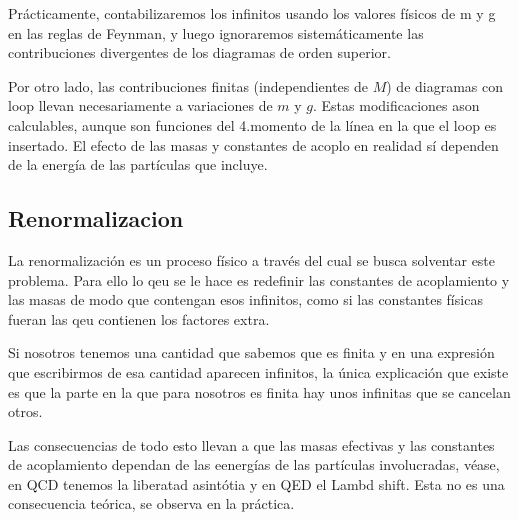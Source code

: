 Prácticamente, contabilizaremos los infinitos usando los valores físicos de m y g en las reglas de Feynman, y luego ignoraremos sistemáticamente las contribuciones divergentes de los diagramas de orden superior.

Por otro lado, las contribuciones finitas (independientes de $M$) de diagramas con loop llevan necesariamente a variaciones de $m$ y $g$. Estas modificaciones ason calculables, aunque son funciones del 4.momento de la línea en la que el loop es insertado. El efecto de las masas y constantes de acoplo en realidad sí dependen de la energía de las partículas que incluye. 

\subsection{Renormalizacion}

La renormalización es un proceso físico a través del cual se busca solventar este problema. Para ello lo qeu se le hace  es redefinir las constantes de acoplamiento y las masas de modo que contengan esos infinitos, como si las constantes físicas fueran las qeu contienen los factores extra. 

Si nosotros tenemos una cantidad que sabemos que es finita y en una expresión que escribirmos de esa cantidad aparecen infinitos, la única explicación que existe es que la parte en la que para nosotros es finita hay unos infinitas que se cancelan otros.

Las consecuencias de todo esto llevan a que las masas efectivas y las constantes de acoplamiento dependan de las eenergías de las partículas involucradas, véase, en QCD tenemos la liberatad asintótia y en QED el Lambd shift. Esta no es una consecuencia teórica, se observa en la práctica. 